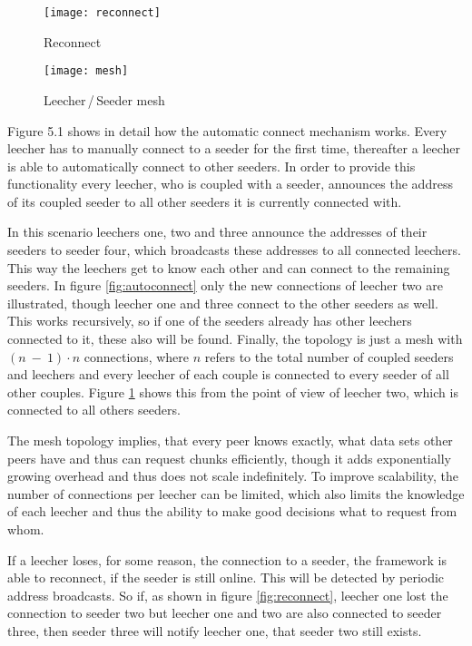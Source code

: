 \begin{figure} [ht]
	\centering
	\begin{minipage}[b]{0.6\linewidth}
		\texttt{[image: reconnect]}
		\caption{Reconnect}
		\label{fig:reconnect}
	\end{minipage}
	\hspace{0.1\linewidth}
	\begin{minipage}[b]{0.25\linewidth}
		\texttt{[image: mesh]}
		\caption{Leecher\,/\,Seeder mesh}
		\label{fig:mesh}
	\end{minipage}
\end{figure}

Figure 5.1 shows in detail how the automatic connect mechanism works. Every leecher has to manually connect to a seeder for the first time, thereafter a leecher is able to automatically connect to other seeders. In order to provide this functionality every leecher, who is coupled with a seeder, announces the address of its coupled seeder to all other seeders it is currently connected with.

In this scenario leechers one, two and three announce the addresses of their seeders to seeder four, which broadcasts these addresses to all connected leechers. This way the leechers get to know each other and can connect to the remaining seeders. In figure \ref{fig:autoconnect} only the new connections of leecher two are illustrated, though leecher one and three connect to the other seeders as well. This works recursively, so if one of the seeders already has other leechers connected to it, these also will be found. Finally, the topology is just a mesh with $(n\:-\:1)\cdot n$ connections, where $n$ refers to the total number of coupled seeders and leechers and every leecher of each couple is connected to every seeder of all other couples. Figure \ref{fig:mesh} shows this from the point of view of leecher two, which is connected to all others seeders.

The mesh topology implies, that every peer knows exactly, what data sets other peers have and thus can request chunks efficiently, though it adds exponentially growing overhead and thus does not scale indefinitely. To improve scalability, the number of connections per leecher can be limited, which also limits the knowledge of each leecher and thus the ability to make good decisions what to request from whom.

If a leecher loses, for some reason, the connection to a seeder, the framework is able to reconnect, if the seeder is still online. This will be detected by periodic address broadcasts. So if, as shown in figure \ref{fig:reconnect}, leecher one lost the connection to seeder two but leecher one and two are also connected to seeder three, then seeder three will notify leecher one, that seeder two still exists.


